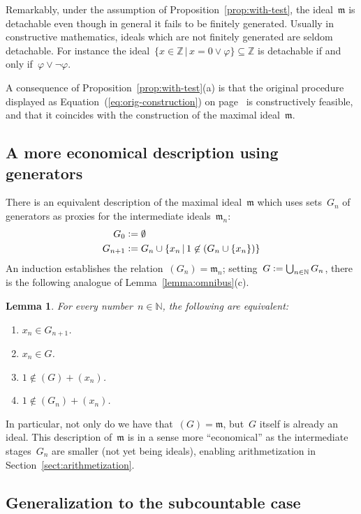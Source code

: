\documentclass[com,11pt,crcready]{iosart2x}
\theoremstyle{definition}
\theoremstyle{plain}
\newtheorem{lemma}[definition]{Lemma}
\theoremstyle{remark}
\newcommand{\mmm}{\mathfrak{m}}
\newcommand{\NN}{\mathbb{N}}
\newcommand{\ZZ}{\mathbb{Z}}
\newcommand{\defeq}{\vcentcolon=}
\renewcommand{\_}{\mathpunct{.}\,}
\begin{document}
Remarkably, under the assumption of Proposition~\ref{prop:with-test}, the ideal~$\mmm$ is detachable even though in
general it fails to be finitely generated. Usually in constructive mathematics, ideals which are not
finitely generated are seldom detachable. For instance the ideal~$\{ x \in
\ZZ \,|\, x = 0 \vee \varphi \} \subseteq \ZZ$ is detachable if and only
if~$\varphi \vee \neg\varphi$.

A consequence of Proposition~\ref{prop:with-test}(a) is that the original
procedure displayed as Equation~(\ref{eq:orig-construction}) on
page~\pageref{eq:orig-construction} is constructively feasible, and that it
coincides with the construction of the maximal ideal~$\mmm$.


\subsection{A more economical description using generators}

There is an equivalent description of the
maximal ideal~$\mmm$ which uses sets~$G_n$ of generators as proxies for the
intermediate ideals~$\mmm_n$:
\begin{align*}
  G_0 &\defeq \emptyset \\
  G_{n+1} &\defeq G_n \cup \{ x_n \,|\, 1 \not\in (G_n \cup \{ x_n \}) \}
\end{align*}
An induction establishes the relation~$(G_n) = \mmm_n$; setting~$G \defeq
\bigcup_{n\in\NN} G_n$, there is the following analogue of
Lemma~\ref{lemma:omnibus}(c).

\begin{lemma}\label{lemma:via-generators}For every number~$n \in \NN$, the following are equivalent:
\begin{enumerate}
\item[(1)] $x_n \in G_{n+1}$.
\item[(2)] $x_n \in G$.
\item[(3)] $1 \not\in (G) + (x_n)$.
\item[(4)] $1 \not\in (G_n) + (x_n)$.
\end{enumerate}
\end{lemma}

In particular, not only do we have that~$(G) = \mmm$, but~$G$ itself is already
an ideal. This description of~$\mmm$ is in a sense more ``economical'' as the
intermediate stages~$G_n$ are smaller (not yet being ideals), enabling
arithmetization in Section~\ref{sect:arithmetization}.


\subsection{Generalization to the subcountable case}
\label{sect:subcountable}
\end{document}
